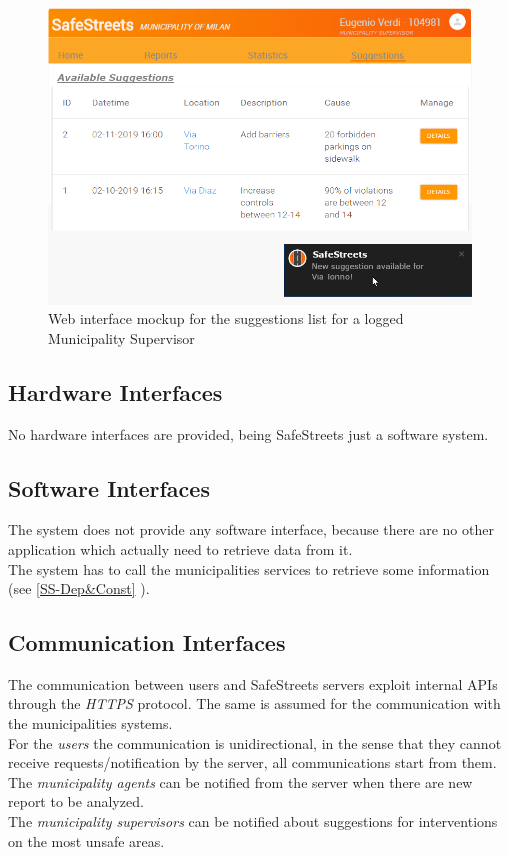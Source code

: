 \documentclass[a4paper]{report}
\begin{document}
\begin{figure}[htp]
\centering
\includegraphics[width= \textwidth]{mockups/homeSuggestions.png}
\caption[Web mockup for suggestions page]{Web interface mockup for the suggestions list for a logged Municipality Supervisor}
\label{fig:mock-suggestions}
\end{figure}
\subsection{Hardware Interfaces}
No hardware interfaces are provided, being SafeStreets just a software system.
\subsection{Software Interfaces}
The system does not provide any software interface, because there are no other application which actually need to retrieve data from it. \\
The system has to call the municipalities services to retrieve some information (see \ref{SS-Dep&Const} ).
\subsection{Communication Interfaces}
The communication between users and SafeStreets servers exploit internal APIs through the \textit{HTTPS} protocol. The same is assumed for the communication with the municipalities systems. \\
For the \textit{users} the communication is unidirectional, in the sense that they cannot receive requests/notification by the server, all communications start from them. \\
The \textit{municipality agents} can be notified from the server when there are new report to be analyzed. \\
The \textit{municipality supervisors} can be notified about suggestions for interventions on the most unsafe areas.
\end{document}
